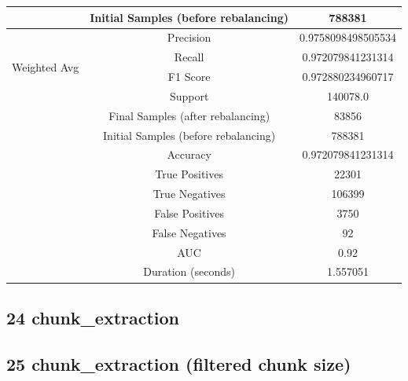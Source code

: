 \begin{longtable}{|c|c|c|}
 & Initial Samples (before rebalancing) & 788381 \\
\hline
\multirow{4}{*}{Weighted Avg} & Precision & 0.9758098498505534 \\
 & Recall & 0.972079841231314 \\
 & F1 Score & 0.972880234960717 \\
 & Support & 140078.0 \\
 & Final Samples (after rebalancing) & 83856 \\
 & Initial Samples (before rebalancing) & 788381 \\
\hline
& Accuracy & 0.972079841231314 \\ \hline
& True Positives & 22301 \\ \hline
& True Negatives & 106399 \\ \hline
& False Positives & 3750 \\ \hline
& False Negatives & 92 \\ \hline
& AUC & 0.92 \\ \hline
& Duration (seconds) & 1.557051 \\ \hline
\end{longtable}


\subsection{24 chunk\_extraction}

\subsection{25 chunk\_extraction (filtered chunk size)}

